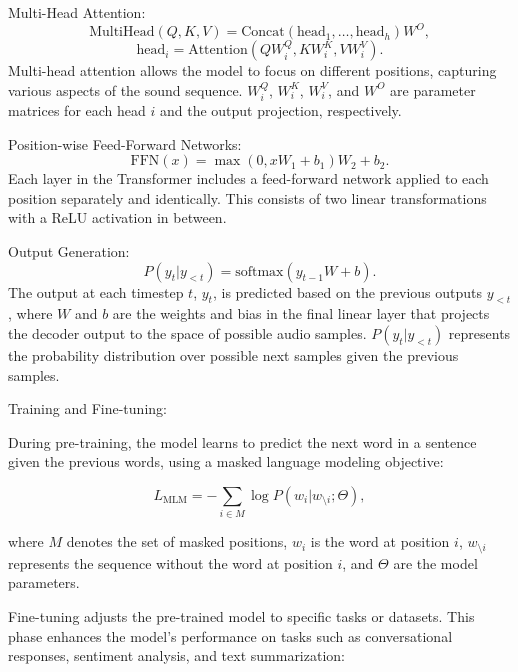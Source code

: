 \documentclass[11pt,a4paper,oneside]{report}
\begin{document}
Multi-Head Attention:
\begin{equation}
\text{MultiHead}(Q, K, V) = \text{Concat}(\text{head}_1, \ldots, \text{head}_h)W^O,
\end{equation}
\begin{equation}
\text{head}_i = \text{Attention}(QW^Q_i, KW^K_i, VW^V_i).
\end{equation}
Multi-head attention allows the model to focus on different positions, capturing various aspects of the sound sequence. $W^Q_i$, $W^K_i$, $W^V_i$, and $W^O$ are parameter matrices for each head $i$ and the output projection, respectively.

Position-wise Feed-Forward Networks:
\begin{equation}
\text{FFN}(x) = \max(0, xW_1 + b_1)W_2 + b_2.
\end{equation}
Each layer in the Transformer includes a feed-forward network applied to each position separately and identically. This consists of two linear transformations with a ReLU activation in between.

Output Generation:
\begin{equation}
P(y_t | y_{<t}) = \text{softmax}(y_{t-1}W + b).
\end{equation}
The output at each timestep $t$, $y_t$, is predicted based on the previous outputs $y_{<t}$, where $W$ and $b$ are the weights and bias in the final linear layer that projects the decoder output to the space of possible audio samples. $P(y_t | y_{<t})$ represents the probability distribution over possible next samples given the previous samples.

Training and Fine-tuning:

During pre-training, the model learns to predict the next word in a sentence given the previous words, using a masked language modeling objective:

\begin{equation}
L_{\text{MLM}} = -\sum_{i \in M} \log P(w_i | w_{\setminus i}; \Theta),
\end{equation}

where $M$ denotes the set of masked positions, $w_i$ is the word at position $i$, $w_{\setminus i}$ represents the sequence without the word at position $i$, and $\Theta$ are the model parameters.

Fine-tuning adjusts the pre-trained model to specific tasks or datasets. This phase enhances the model's performance on tasks such as conversational responses, sentiment analysis, and text summarization:
\end{document}
